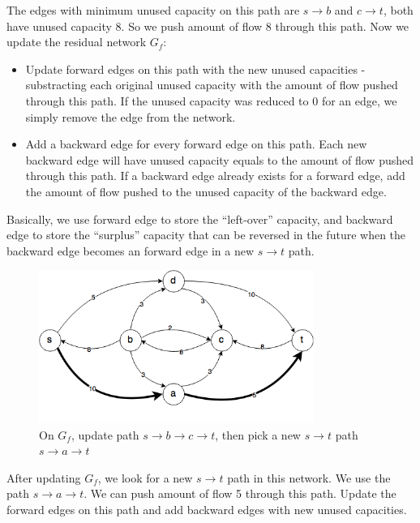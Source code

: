 \documentclass{article}
\begin{document}
The edges with minimum unused capacity on this path are $s \rightarrow b$
and $c \rightarrow t$, both have unused capacity 8. So we push amount of
flow 8 through this path.
Now we update the residual network $G_f$:
\begin{itemize}
\item Update forward edges on this path with the new unused capacities
- substracting each original unused capacity with the amount of flow 
pushed through this path. If the unused capacity was reduced to 0 for an edge,
we simply remove the edge from the network. 
\item Add a backward edge for every forward edge on this path.
Each new backward edge will have unused capacity equals to the amount of
flow pushed through this path. If a backward edge already exists for a
forward edge, add the amount of flow pushed to the unused capacity of the
backward edge.
\end{itemize} 
Basically, we use forward edge to store the ``left-over'' capacity,
and backward edge to store the ``surplus'' capacity that can be
reversed in the future when the backward edge becomes an forward edge in
a new $s \rightarrow t$ path.

\begin{figure}[H]
\centering
\includegraphics[width=0.8\textwidth]{gf_1.png}
\caption{On $G_f$, update path $s \rightarrow b \rightarrow c \rightarrow t$, then pick a new $s \rightarrow t$ path
$s \rightarrow a \rightarrow t$}
\end{figure}

After updating $G_f$, we look for a new $s \rightarrow t$ path in this 
network. We use the path $s \rightarrow a \rightarrow t$.
We can push amount of flow 5 through this path.
Update the forward edges on this path and add backward edges with
new unused capacities.
\end{document}

